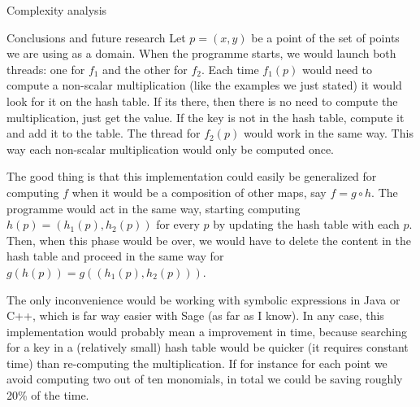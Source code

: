 \documentclass[11pt, a4paper, english, twoside, notitlepage, openright]{report}
\begin{document}
\begin{chapter}{Complexity analysis}
\begin{section}{Conclusions and future research}
Let $p = (x,y)$ be a point of the set of points we are using as a domain. When the programme starts, we would launch both threads: one for $f_1$ and the other for $f_2$. Each time $f_1(p)$ would need to compute a non-scalar multiplication (like the examples we just stated) it would look for it on the hash table. If its there, then there is no need to compute the multiplication, just get the value. If the key is not in the hash table, compute it and add it to the table. The thread for $f_2(p)$ would work in the same way. This way each non-scalar multiplication would only be computed once.

The good thing is that this implementation could easily be generalized for computing $f$ when it would be a composition of other maps, say $f = g\circ h$. The programme would act in the same way, starting computing $h(p)= (h_1(p), h_2(p))$ for every $p$ by updating the hash table with each $p$. Then, when this phase would be over, we would have to delete the content in the hash table and proceed in the same way for $g(h(p))= g((h_1(p), h_2(p)))$.

The only inconvenience would be working with symbolic expressions in Java or C++, which is far way easier with Sage (as far as I know). In any case, this implementation would probably mean a improvement in time, because searching for a key in a (relatively small) hash table would be quicker (it requires constant time) than re-computing the multiplication. If for instance for each point we avoid computing two out of ten monomials, in total we could be saving roughly 20\% of the time.

\end{section}



\end{chapter}
\end{document}
